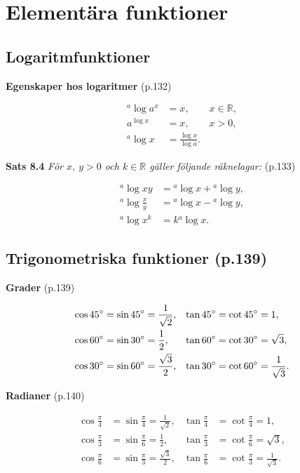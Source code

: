 \documentclass[11pt]{article}
\begin{document}
\section{Elementära funktioner}

\subsection{Logaritmfunktioner}

\textbf{Egenskaper hos logaritmer} (p.132)

\begin{align}
    {}^a\log a^x &= x, \qquad x \in \mathbb{R},\\
    a^{\log x} &= x, \qquad x > 0,\\
    {}^a\log x &= \frac{\log{x}}{\log{a}}.
\end{align}

\textbf{Sats 8.4} \textit{För $x,\ y > 0$ och $k \in \mathbb{R}$ gäller följande räknelagar:} (p.133)

\begin{align}
    {}^a\log xy &= {}^a\log x + {}^a\log y,\\
    {}^a\log \frac{x}{y} &= {}^a\log x - {}^a\log y,\\
    {}^a\log x^k &= k{}^a\log x.
\end{align}

\subsection{Trigonometriska funktioner (p.139)}

\textbf{Grader} (p.139)

\begin{align}
    \cos 45\degree &= \sin 45\degree = \frac{1}{\sqrt{2}}, &\tan 45\degree &= \cot 45\degree = 1,\\
    \cos 60\degree &= \sin 30\degree = \frac{1}{2},        &\tan 60\degree &= \cot 30\degree = \sqrt{3},\\
    \cos 30\degree &= \sin 60\degree = \frac{\sqrt{3}}{2}, &\tan 30\degree &= \cot 60\degree = \frac{1}{\sqrt{3}}.
\end{align}

\textbf{Radianer} (p.140)

\begin{align}
    \cos \frac{\pi}{4} &= \sin \frac{\pi}{4} = \frac{1}{\sqrt{2}}, &\tan \frac{\pi}{4} &= \cot \frac{\pi}{4} = 1,\\
    \cos \frac{\pi}{3} &= \sin \frac{\pi}{6} = \frac{1}{2},        &\tan \frac{\pi}{3} &= \cot \frac{\pi}{6} = \sqrt{3},\\
    \cos \frac{\pi}{6} &= \sin \frac{\pi}{3} = \frac{\sqrt{3}}{2}, &\tan \frac{\pi}{6} &= \cot \frac{\pi}{3} = \frac{1}{\sqrt{3}}.
\end{align}
\end{document}
